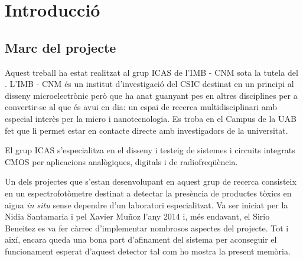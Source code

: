 \chapter{Introducció}\label{ch:introduccio}









\section{Marc del projecte}\label{sec:marc_del_projecte}






Aquest treball ha estat realitzat al grup \ac{ICAS} de l'\ac{IMB} - \ac{CNM} sota la tutela del \pfcsupervisor. L'\ac{IMB} - \ac{CNM} és un institut d’investigació del \ac{CSIC} destinat en un principi al disseny microelectrònic però que ha anat guanyant pes en altres disciplines per a convertir-se al que és avui en dia: un espai de recerca multidisciplinari amb especial interès per la micro i nanotecnologia. Es troba en el Campus de la \ac{UAB} fet que li permet estar en contacte directe amb investigadors de la universitat.

El grup \ac{ICAS} s'especialitza en el disseny i testeig de sistemes i circuits integrats \ac{CMOS} per aplicacions analògiques, digitals i de radiofreqüència. 

Un dels projectes que s'estan desenvolupant en aquest grup de recerca consisteix en un espectrofotòmetre destinat a detectar la presència de productes tòxics en aigua \textit{in situ} sense dependre d'un laboratori especialitzat. Va ser iniciat per la Nidia Santamaria i pel Xavier Muñoz \cite{sanahuja:2015,pujol:2016} l'any 2014 i, més endavant, el Sirio Beneitez \cite{sirio:2015} es va fer càrrec d'implementar nombrosos aspectes del projecte. Tot i així, encara queda una bona part d'afinament del sistema per aconseguir el funcionament esperat d'aquest detector tal com ho mostra la present memòria.

